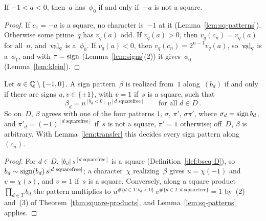 \begin{corollary}
  \label{cor:phi0-neg1}
  \leanok
  If $-1 < a < 0$, then~$a$ has~$\phi_0$ if and only if~$-a$ is not a square.
\end{corollary}
\begin{proof}
  \leanok
  If $c_1 = -a$ is a square, no character is~$-1$ at it (Lemma~\ref{lem:sq-patterns}). Otherwise
  some prime~$q$ has $v_q(a)$ odd. If $v_q(a) > 0$, then $v_q(c_n) = v_q(a)$ for all~$n$,
  and~$\operatorname{val}_q$ is a~$\phi_0$. If $v_q(a) < 0$, then $v_q(c_n) = 2^{n-1} v_q(a)$, so~$\operatorname{val}_q$ is
  a~$\phi_1$, and with $\tau = \operatorname{sign}$ (Lemma~\ref{lem:signs}(2)) it gives~$\phi_0$
  (Lemma~\ref{lem:klein}).
\end{proof}

\begin{corollary}
  \label{cor:patterns}
  \leanok
  Let $a \in \mathbb{Q} \setminus \{-1, 0\}$. A sign pattern~$\beta$ is realized from~$1$ along~$(b_d)$
  if and only if there are signs $u, v \in \{\pm 1\}$, with $v = 1$ if~$s$ is a square, such that
  \[ \beta_d = u^{[b_d < 0]}\, v^{[d \text{ squarefree}]} \qquad\text{for all } d \in D\,. \]
  So on~$D$, $\beta$ agrees with one of the four patterns $1$, $\sigma$, $\pi'$, $\sigma\pi'$,
  where $\sigma_d = \operatorname{sign} b_d$, and $\pi'_d = (-1)^{[d \text{ squarefree}]}$ if~$s$ is not a square,
  $\pi' = 1$ otherwise; off~$D$, $\beta$ is arbitrary. With Lemma~\ref{lem:transfer} this decides
  every sign pattern along~$(c_n)$.
\end{corollary}
\begin{proof}
  \leanok
  For $d \in D$, $|b_d|\, s^{[d \text{ squarefree}]}$ is a square (Definition~\ref{def:bseq-D}),
  so $b_d \sim \operatorname{sign}(b_d)\, s^{[d \text{ squarefree}]}$; a character~$\chi$ realizing~$\beta$ gives
  $u = \chi(-1)$ and $v = \chi(s)$, and $v = 1$ if~$s$ is a square. Conversely, along a square
  product $\prod_{d \in T} b_d$ the pattern multiplies to
  $u^{\#\{d \in T : b_d < 0\}}\, v^{\#\{d \in T : d \text{ squarefree}\}} = 1$ by~(2) and~(3) of
  Theorem~\ref{thm:square-products}, and Lemma~\ref{lem:sq-patterns} applies.
\end{proof}

